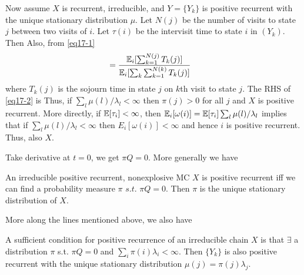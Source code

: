 \documentclass[all-lectures.tex]{subfiles}
\begin{document}
Now assume $X$ is recurrent, irreducible, and $Y = \{Y_k\}$ is positive recurrent with the unique stationary distribution $\mu$. Let $N(j)$ be the number of visits to state $j$ between two visits of $i$. Let $\tau(i)$ be the intervisit time to state $i$ in $(Y_k)$. Then
Also, from \ref{eq17-1}
\begin{align}
\label{eq17-2}
&= \frac{\mathbb{E}_i[\sum_{k=1}^{N(j)} T_k(j)]}{\mathbb{E}_i[\sum_k \sum_{k=1}^{N(k)} T_k(j)]}
\end{align}
where $T_k(j)$ is the sojourn time in state $j$ on $k$th visit to state $j$. The RHS of \ref{eq17-2} is
Thus, if $\sum_l \mu(l)/\lambda_l < \infty$ then $\pi(j) > 0$ for all $j$ and $X$ is positive recurrent.
More directly, if $\mathbb{E}[\tau_i] < \infty$, then $\mathbb{E}_i[\omega(i)] = \mathbb{E}[\tau_i] \sum_l \mu(l)/\lambda_l$
implies that if $\sum_l \mu(l)/\lambda_l < \infty$ then $E_i[\omega(i)] < \infty $ and hence $i$ is positive recurrent. Thus, also $X$.

Take derivative at $t=0$, we get $\pi Q =0$. More generally we have
\begin{prop}
An irreducible positive recurrent, nonexplosive MC $X$ is positive recurrent iff we can find a probability measure $\pi$ $s.t.$ $\pi Q = 0$. Then $\pi$ is the unique stationary distribution of $X$.
\end{prop}
More along the lines mentioned above, we also have
\begin{prop}
A sufficient condition for positive recurrence of an irreducible chain $X$ is that $\exists$ a distribution $\pi$ s.t. $\pi Q = 0$ and $\sum_i \pi(i) \lambda_i < \infty$. 
Then $\{Y_k\}$ is also positive recurrent with the unique stationary distribution $\mu(j) = \pi(j) \lambda_j.$
\end{prop}
\end{document}
